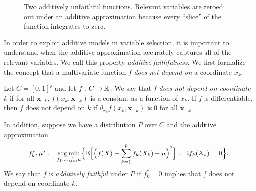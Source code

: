 \begin{figure}[htp]
\vskip-10pt
	\centering
\caption{Two additively unfaithful functions. Relevant variables are
  zeroed out under an additive approximation because every ``slice''
  of the function integrates to zero.}
\vskip-10pt
\end{figure}

In order to exploit additive models in variable selection, it is important to understand when the
additive approximation accurately captures all of the relevant variables.
We call this property \textit{additive faithfulness}. We first formalize the concept that a multivariate function $f$ \emph{does not depend on} a coordinate $x_k$.

\begin{definition}
Let $C = [0,1]^p$ and let $f: C \rightarrow {\mathbb R}$. We say that $f$ \textit{does not depend on coordinate $k$} if for all $\mathbf{x}_{-k}$, $f(x_k, \mathbf{x}_{-k})$ is a constant as a function of $x_k$. If $f$ is differentiable, then $f$ does not depend on $k$ if $\partial_{x_k} f(x_k, \mathbf{x}_{-k})$ is 0 for all $\mathbf{x}_{-k}$.

In addition, suppose we have a distribution $P$ over $C$ and the additive approximation
\begin{equation}
\label{eqn:unconstrained_additive}
f_k^*, \mu^* := \mathop{\text{\rm arg\,min}}_{f_1,\ldots, f_p, \mu} \Bigl\{ 
             {\mathbb E} \Bigl[\Bigl( f(X) - \sum_{k=1}^p f_k(X_k) -\mu \Bigr)^2 \Bigr]
         \,:\, {\mathbb E} f_k(X_k) = 0 \Bigr\}.
\end{equation}
We say that $f$ is \textit{additively faithful} under $P$ if
$f^*_k = 0$ implies that $f$ does not depend on coordinate $k$.
\end{definition}

